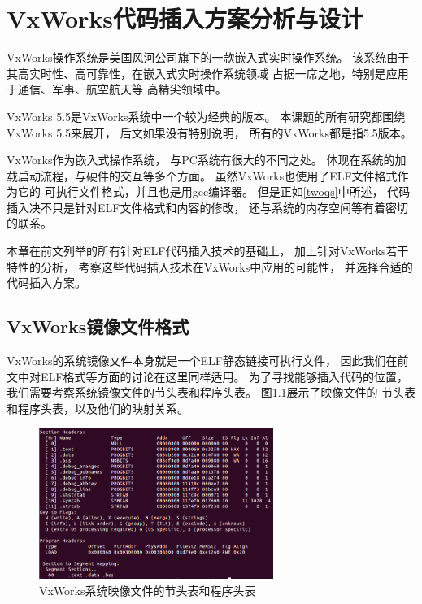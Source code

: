 \chapter{VxWorks代码插入方案分析与设计}

VxWorks操作系统是美国风河公司旗下的一款嵌入式实时操作系统。
该系统由于其高实时性、高可靠性，在嵌入式实时操作系统领域
占据一席之地，特别是应用于通信、军事、航空航天等
高精尖领域中。

VxWorks 5.5是VxWorks系统中一个较为经典的版本。
本课题的所有研究都围绕VxWorks 5.5来展开，
后文如果没有特别说明，
所有的VxWorks都是指5.5版本。

VxWorks作为嵌入式操作系统，
与PC系统有很大的不同之处。
体现在系统的加载启动流程，与硬件的交互等多个方面。
虽然VxWorks也使用了ELF文件格式作为它的
可执行文件格式，并且也是用gcc编译器。
但是正如\ref{twoqs}中所述，
代码插入决不只是针对ELF文件格式和内容的修改，
还与系统的内存空间等有着密切的联系。

本章在前文列举的所有针对ELF代码插入技术的基础上，
加上针对VxWorks若干特性的分析，
考察这些代码插入技术在VxWorks中应用的可能性，
并选择合适的代码插入方案。


\section{VxWorks镜像文件格式}

VxWorks的系统镜像文件本身就是一个ELF静态链接可执行文件，
因此我们在前文中对ELF格式等方面的讨论在这里同样适用。
为了寻找能够插入代码的位置，
我们需要考察系统镜像文件的节头表和程序头表。
图\ref{shtandpht}展示了映像文件的
节头表和程序头表，以及他们的映射关系。

\begin{figure}[h!]
    \centering
    \includegraphics[width=0.68\textwidth]{figure/shtandpht.png}
    \caption{VxWorks系统映像文件的节头表和程序头表}
    \label{shtandpht}
\end{figure}

